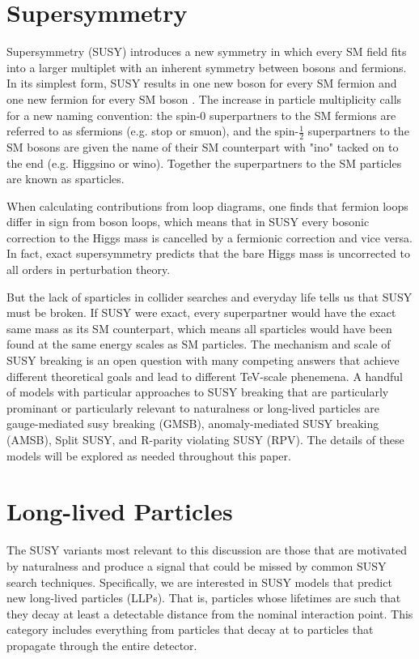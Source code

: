 \documentclass[12pt]{article}
\begin{document}
\section{Supersymmetry}
    Supersymmetry (SUSY) introduces a new symmetry in which every SM field fits into a larger multiplet with an inherent symmetry between bosons and fermions. In its simplest form, SUSY results in one new boson for every SM fermion and one new fermion for every SM boson . The increase in particle multiplicity calls for a new naming convention: the spin-0 superpartners to the SM fermions are referred to as sfermions (e.g. stop or smuon), and the spin-$\frac{1}{2}$ superpartners to the SM bosons are given the name of their SM counterpart with "ino" tacked on to the end (e.g. Higgsino or wino). Together the superpartners to the SM particles are known as sparticles. 

    When calculating contributions from loop diagrams, one finds that fermion loops differ in sign from boson loops, which means that in SUSY every bosonic correction to the Higgs mass is cancelled by a fermionic correction and vice versa. In fact, exact supersymmetry predicts that the bare Higgs mass is uncorrected to all orders in perturbation theory. 

    But the lack of sparticles in collider searches and everyday life tells us that SUSY must be broken. If SUSY were exact, every superpartner would have the exact same mass as its SM counterpart, which means all sparticles would have been found at the same energy scales as SM particles. The mechanism and scale of SUSY breaking is an open question with many competing answers that achieve different theoretical goals and lead to different TeV-scale phenemena. A handful of models with particular approaches to SUSY breaking that are particularly prominant or particularly relevant to naturalness or long-lived particles are gauge-mediated susy breaking (GMSB), anomaly-mediated SUSY breaking (AMSB), Split SUSY, and R-parity violating SUSY (RPV). The details of these models will be explored as needed throughout this paper.

\section{Long-lived Particles}
    The SUSY variants most relevant to this discussion are those that are motivated by naturalness and  produce a signal that could be missed by common SUSY search techniques. Specifically, we are interested in SUSY models that predict new long-lived particles (LLPs).  That is, particles whose lifetimes are such that they decay at least a detectable distance from the nominal interaction point. This category includes everything from particles that decay at  to particles that propagate through the entire detector. 
\end{document}
